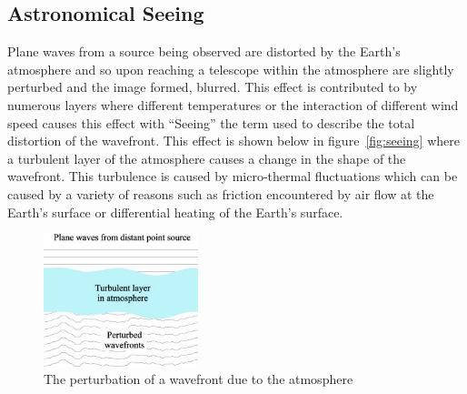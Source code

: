 	\subsection{Astronomical Seeing} %
	\label{sub:astronomical_seeing}
		Plane waves from a source being observed are distorted by the Earth’s atmosphere and so upon reaching a telescope within the atmosphere are slightly perturbed and the image formed, blurred. This effect is contributed to by numerous layers where different temperatures or the interaction of different wind speed causes this effect with ``Seeing'' the term used to describe the total distortion of the wavefront\cite[p.~188]{Diffraction_Limited_Imaging_Saha}. This effect is shown below in figure~\ref{fig:seeing} where a turbulent layer of the atmosphere causes a change in the shape of the wavefront. This turbulence is caused by micro-thermal fluctuations which can be caused by a variety of reasons such as friction encountered by air flow at the Earth’s surface or differential heating of the Earth’s surface\cite[p.~161]{Diffraction_Limited_Imaging_Saha}.
		\begin{figure}[!htb]
			\centering
			\includegraphics[width=0.4\textwidth]{../Images/Seeing.png}
			\caption{The perturbation of a wavefront due to the atmosphere\cite{Seeing}\label{fig:Seeing}}
		\end{figure}

